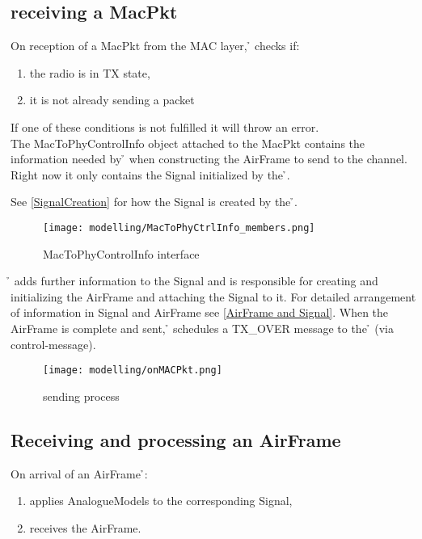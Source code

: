 \subsection{receiving a MacPkt}

On reception of a MacPkt from the MAC layer, \h{\bp} checks if:
\begin{enumerate}
	\item the radio is in TX state,
	\item it is not already sending a packet 
\end{enumerate} 

If one of these conditions is not fulfilled it will throw an error.\\

The MacToPhyControlInfo object attached to the MacPkt contains the information
needed by \h{\bp} when constructing the AirFrame to send to the channel.
Right now it only contains the Signal initialized by the \h{\bm}.

See \ref{SignalCreation} for how the Signal is created by the \h{\bm}.

\begin{figure}[H]
 \centering
 \texttt{[image: modelling/MacToPhyCtrlInfo\_members.png]}
 \caption{MacToPhyControlInfo interface}
 \label{fig: MacToPhyCtrlInfo interface}
\end{figure}


\h{\bp} adds further information to the Signal and is responsible for creating
and initializing the AirFrame and attaching the Signal to it.
For detailed arrangement of information in Signal and AirFrame see \ref{AirFrame
and Signal}.
When the AirFrame is complete and sent, \h{\bp} schedules a TX\_OVER message to
the \h{\bm} (via control-message).

\begin{figure}[H]
 \centering
 \texttt{[image: modelling/onMACPkt.png]}
 \caption{sending process}
 \label{fig: sending process}
\end{figure}
\newpage



\subsection{Receiving and processing an AirFrame}

On arrival of an AirFrame \h{\bp}:
\begin{enumerate}
	
	\item applies AnalogueModels to the corresponding
Signal,
	\item receives the AirFrame.
\end{enumerate}

